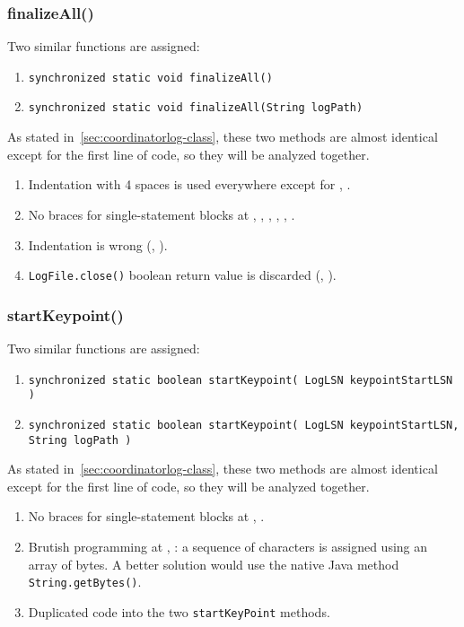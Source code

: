 \subsubsection{finalizeAll()}
Two similar functions are assigned:
\begin{enumerate}
    \item \texttt{\footnotesize synchronized static void finalizeAll()}
    \item \texttt{\footnotesize synchronized static void finalizeAll(String logPath)}
\end{enumerate}

As stated in~\autoref{sec:coordinatorlog-class}, these two methods are almost identical except for the first line of code, so they will be analyzed together.

\begin{enumerate}
    \item {} Indentation with 4 spaces is used everywhere except for , .
    \item {} No braces for single-statement blocks at , , , , , .
    \item {} Indentation is wrong (, ).
    \item {} \texttt{LogFile.close()} boolean return value is discarded (, ).
\end{enumerate}

\subsubsection{startKeypoint()}
Two similar functions are assigned:
\begin{enumerate}
    \item \texttt{\footnotesize synchronized static boolean startKeypoint( LogLSN keypointStartLSN )}
    \item \texttt{\footnotesize synchronized static boolean startKeypoint( LogLSN keypointStartLSN, String logPath )}
\end{enumerate}

As stated in~\autoref{sec:coordinatorlog-class}, these two methods are almost identical except for the first line of code, so they will be analyzed together.

\begin{enumerate}
    \item {} No braces for single-statement blocks at , .
    \item {} Brutish programming at , : a sequence of characters is assigned using an array of bytes. A better solution would use the native Java method \texttt{String.getBytes()}.
    \item {} Duplicated code into the two \texttt{startKeyPoint} methods.
\end{enumerate}


